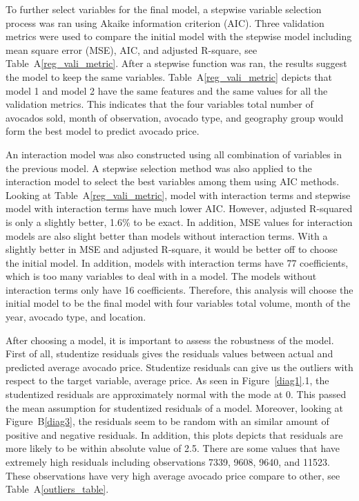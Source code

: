 \documentclass[11pt]{article}\usepackage[]{graphicx}\usepackage[]{color}
\begin{document}
\noindent To further select variables for the final model, a stepwise variable selection process was ran using Akaike information criterion (AIC). Three validation metrics were used to compare the initial model with the stepwise model including mean square error (MSE), AIC, and adjusted R-square, see Table~A\ref{reg_vali_metric}. After a stepwise function was ran, the results suggest the model to keep the same variables. Table~A\ref{reg_vali_metric} depicts that model 1 and model 2 have the same features and the same values for all the validation metrics. This indicates that the four variables total number of avocados sold, month of observation, avocado type, and geography group would form the best model to predict avocado price.
\hfill \break

\noindent An interaction model was also constructed using all combination of variables in the previous model. A stepwise selection method was also applied to the interaction model to select the best variables among them using AIC methods. Looking at Table~A\ref{reg_vali_metric}, model with interaction terms and stepwise model with interaction terms have much lower AIC. However, adjusted R-squared is only a slightly better, 1.6\% to be exact. In addition, MSE values for interaction models are also slight better than models without interaction terms. With a slightly better in MSE and adjusted R-square, it would be better off to choose the initial model. In addition, models with interaction terms have 77 coefficients, which is too many variables to deal with in a model. The models without interaction terms only have  16 coefficients. Therefore, this analysis will choose the initial model to be the final model with four variables total volume, month of the year, avocado type, and location.      
\hfill \break

\noindent After choosing a model, it is important to assess the robustness of the model. First of all, studentize residuals gives the residuals values between actual and predicted average avocado price. Studentize residuals can give us the outliers with respect to the target variable, average price. As seen in Figure~\ref{diag1}.1, the studentized residuals are approximately normal with the mode at 0. This passed the mean assumption for studentized residuals of a model. Moreover, looking at Figure~B\ref{diag3}, the residuals seem to be random with an similar amount of positive and negative residuals. In addition, this plots depicts that residuals are more likely to be within absolute value of 2.5. There are some values that have extremely high residuals including observations 7339, 9608, 9640, and 11523. These observations have very high average avocado price compare to other, see Table~A\ref{outliers_table}.       
\end{document}
